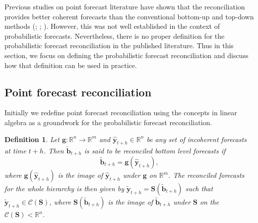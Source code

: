 \documentclass[a4paper, 11pt]{article}
\newtheorem{definition}{Definition}[section]
\begin{document}
Previous studies on point forecast literature have shown that the reconciliation provides better coherent forecasts than the conventional bottom-up and top-down methods (\cite{Hyndman2011}; \cite{VanErven2015a}; \cite{Wickramasuriya2017}). However, this was not well established in the context of probabilistic forecasts. Nevertheless, there is no proper definition for the probabilistic forecast reconciliation in the published literature. Thus in this section, we focus on defining the probabilistic forecast reconciliation and discuss how that definition can be used in practice.

\subsection{Point forecast reconciliation}

Initially we redefine point forecast reconciliation using the concepts in linear algebra as a groundwork for the probabilistic forecast reconciliation.

\begin{definition}
Let $\bm{g}:\mathbb{R}^n \rightarrow \mathbb{R}^m $ and $\hat{\bm{y}}_{t+h} \in \mathbb{R}^n$ be any set of incoherent forecasts at time $t+h$. Then $\tilde{\bm{b}}_{t+h}$ is said to be reconciled bottom level forecasts if
\begin{equation}
  \tilde{\bm{b}}_{t+h}=\bm{g}(\hat{\bm{y}}_{t+h}),
\end{equation}
where $\bm{g}(\hat{\bm{y}}_{t+h})$ is the image of $\hat{\bm{y}}_{t+h}$ under $\bm{g}$ on $\mathbb{R}^m$. The reconciled forecasts for the whole hierarchy is then given by $\tilde{\bm{y}}_{t+h}=\bm{S}(\tilde{\bm{b}}_{t+h})$ such that $\tilde{\bm{y}}_{t+h} \in \mathscr{C}(\bm{S})$, where $\bm{S}(\tilde{\bm{b}}_{t+h})$ is the image of $\tilde{\bm{b}}_{t+h}$ under $\bm{S}$ on the $\mathscr{C}(\bm{S}) < \mathbb{R}^n$.
\end{definition}
\end{document}
